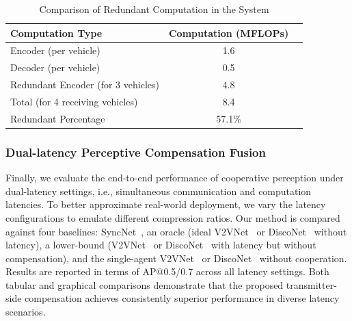 \begin{table}[ht]
\centering
\caption{Comparison of Redundant Computation in the System}
\begin{tabular}{lcc}
\toprule
\textbf{Computation Type} & \textbf{Computation (MFLOPs)} \\
\midrule
Encoder (per vehicle) & 1.6 \\
Decoder (per vehicle) & 0.5 \\
Redundant Encoder (for 3 vehicles) & 4.8 \\
Total (for 4 receiving vehicles) & 8.4 \\
\midrule
Redundant Percentage & 57.1\% \\
\bottomrule
\end{tabular}
\label{tab:redundant_computation_comparison}
\end{table}


\subsubsection{\textbf{Dual-latency Perceptive Compensation Fusion}}
Finally, we evaluate the end-to-end performance of cooperative perception under dual-latency settings, i.e., simultaneous communication and computation latencies. To better approximate real-world deployment, we vary the latency configurations to emulate different compression ratios. Our method is compared against four baselines: SyncNet~\cite{lei2022latency}, an oracle (ideal V2VNet~\cite{wang2020v2vnet} or DiscoNet~\cite{li2021learning} without latency), a lower-bound (V2VNet~\cite{wang2020v2vnet} or DiscoNet~\cite{li2021learning} with latency but without compensation), and the single-agent V2VNet~\cite{wang2020v2vnet} or DiscoNet~\cite{li2021learning} without cooperation. Results are reported in terms of AP@0.5/0.7 across all latency settings. Both tabular and graphical comparisons demonstrate that the proposed transmitter-side compensation achieves consistently superior performance in diverse latency scenarios.



